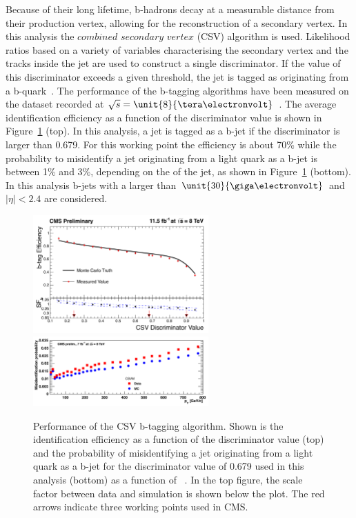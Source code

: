 Because of their long lifetime, b-hadrons decay at a measurable distance from their production vertex, allowing for the reconstruction of a secondary vertex. In this analysis the $\textit{combined}$ $\textit{secondary}$ $\textit{vertex}$ (CSV) algorithm is used. Likelihood ratios based on a variety of variables characterising the secondary vertex and the tracks inside the jet are used to construct a single discriminator. If the value of this discriminator exceeds a given threshold, the jet is tagged as originating from a b-quark~\cite{Chatrchyan:2012jua}. The performance of the b-tagging algorithms have been measured on the dataset recorded at $\sqrt{s} = \unit{8}{\tera\electronvolt}$~\cite{CMS-DP-2013-005}. The average identification efficiency as a function of the discriminator value is shown in Figure~\ref{fig:bTagging} (top). In this analysis, a jet is tagged as a b-jet if the discriminator is larger than 0.679. For this working point the efficiency is about 70\% while the probability to misidentify a jet originating from a light quark as a b-jet is between 1\% and 3\%, depending on the \pt of the jet, as shown in Figure~\ref{fig:bTagging} (bottom). In this analysis b-jets with a \pt larger than $\unit{30}{\giga\electronvolt}$ and $|\eta| < 2.4$ are considered. 
\begin{figure}[htbp]
\centering

\includegraphics[width=0.6\textwidth]{plots/RECO/bTagEfficiency.png}\\

\includegraphics[width=0.6\textwidth]{plots/RECO/bTagMisID.png}\\

\caption{Performance of the CSV b-tagging algorithm. Shown is the identification efficiency as a function of the discriminator value (top) and the probability of misidentifying a jet originating from a light quark as a b-jet for the discriminator value of 0.679 used in this analysis (bottom) as a function of \pt~\cite{CMS-DP-2013-005}. In the top figure, the scale factor between data and simulation is shown below the plot. The red arrows indicate three working points used in CMS.}
\label{fig:bTagging}
\end{figure} 

